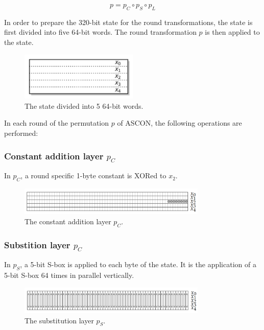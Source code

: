 \[p=p_C \circ p_S \circ p_L\]

In order to prepare the 320-bit state for the round transformations, the state is first divided into five 64-bit words. The round transformation $p$ is then applied to the state. \cite{DBLP:journals/joc/DobraunigEMS21} \par 

\begin{figure}[htbp]
  \centering
  \includegraphics[width=0.5\textwidth]{images/state.png}
  \caption{The state divided into 5 64-bit words.}
  \label{fig:state}
\end{figure}

In each round of the permutation $p$ of ASCON, the following operations are performed:

\subsubsection{Constant addition layer $p_C$}
In $p_C$, a round specific 1-byte constant is XORed to $x_2$. \cite{ascon_specification, analysis_of_ascon}
  
\begin{figure}[htbp]
  \centering
  \includegraphics[width=0.8\textwidth]{images/constant.png}
  \caption{The constant addition layer $p_C$.}
  \label{fig:constant}
\end{figure}

\subsubsection{Substition layer $p_C$}
In $p_S$, a 5-bit S-box is applied to each byte of the state. It is the application of a 5-bit S-box 64 times in parallel vertically. \cite{ascon_specification, analysis_of_ascon}

\begin{figure}[htbp]
  \centering
  \includegraphics[width=0.8\textwidth]{images/substitution.png}
  \caption{The substitution layer $p_S$.}
  \label{fig:substition}
\end{figure}

